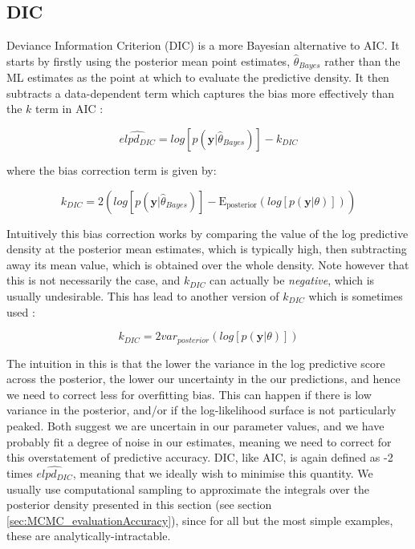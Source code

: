 \documentclass[11pt,fullpage]{book}
\begin{document}
\subsection{DIC}
Deviance Information Criterion (DIC) \cite{spiegelhalter2002bayesian} is a more Bayesian alternative to AIC. It starts by firstly using the posterior mean point estimates, $\hat{\theta}_{Bayes}$ rather than the ML estimates as the point at which to evaluate the predictive density. It then subtracts a data-dependent term which captures the bias more effectively than the $k$ term in AIC \cite{gelman2013bayesian}:

\begin{equation}\label{eq:Evaluation_DIC}
\widehat{elpd_{DIC}} = log \left[p(\boldsymbol{y}|\hat{\theta}_{Bayes})\right] - k_{DIC}
\end{equation}

where the bias correction term is given by:

\begin{equation}\label{eq:Evaluation_DIC1}
k_{DIC} = 2\left(log\left[ p(\boldsymbol{y}|\hat{\theta}_{Bayes})\right] - \mathrm{E_{posterior}}(log\left[ p(\boldsymbol{y}|\theta)\right])\right)
\end{equation}

Intuitively this bias correction works by comparing the value of the log predictive density at the posterior mean estimates, which is typically high, then subtracting away its mean value, which is obtained over the whole density. Note however that this is not necessarily the case, and $k_{DIC}$ can actually be \textit{negative}, which is usually undesirable. This has lead to another version of $k_{DIC}$ which is sometimes used \cite{gelman2013bayesian}:

\begin{equation}\label{eq:Evaluation_DIC2}
k_{DIC} = 2 var_{posterior}\left(log[p(\boldsymbol{y}|\theta)]\right)
\end{equation}

The intuition in this is that the lower the variance in the log predictive score across the posterior, the lower our uncertainty in the our predictions, and hence we need to correct less for overfitting bias. This can happen if there is low variance in the posterior, and/or if the log-likelihood surface is not particularly peaked. Both suggest we are uncertain in our parameter values, and we have probably fit a degree of noise in our estimates, meaning we need to correct for this overstatement of predictive accuracy. 
DIC, like AIC, is again defined as -2 times $\widehat{elpd_{DIC}}$, meaning that we ideally wish to minimise this quantity. We usually use computational sampling to approximate the integrals over the posterior density presented in this section (see section \ref{sec:MCMC_evaluationAccuracy}), since for all but the most simple examples, these are analytically-intractable.
\end{document}
